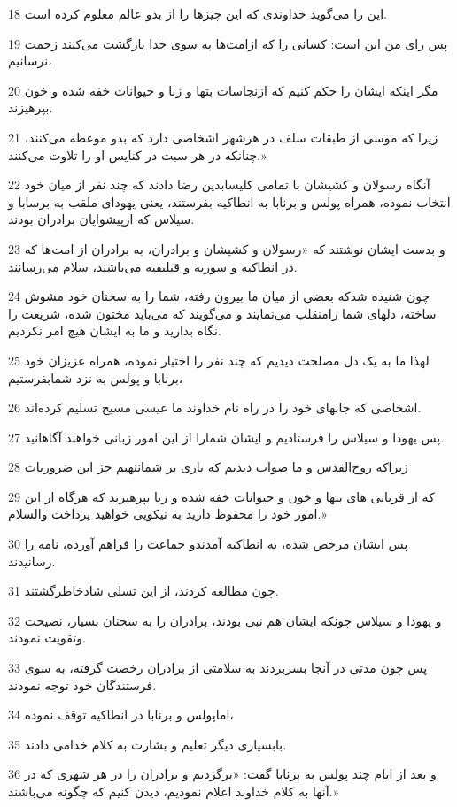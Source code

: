 \par 18 این را می‌گوید خداوندی که این چیزها را از بدو عالم معلوم کرده است.
\par 19 پس رای من این است: کسانی را که ازامت‌ها به سوی خدا بازگشت می‌کنند زحمت نرسانیم،
\par 20 مگر اینکه ایشان را حکم کنیم که ازنجاسات بتها و زنا و حیوانات خفه شده و خون بپرهیزند.
\par 21 زیرا که موسی از طبقات سلف در هرشهر اشخاصی دارد که بدو موعظه می‌کنند، چنانکه در هر سبت در کنایس او را تلاوت می‌کنند.»
\par 22 آنگاه رسولان و کشیشان با تمامی کلیسابدین رضا دادند که چند نفر از میان خود انتخاب نموده، همراه پولس و برنابا به انطاکیه بفرستند، یعنی یهودای ملقب به برسابا و سیلاس که ازپیشوایان برادران بودند.
\par 23 و بدست ایشان نوشتند که «رسولان و کشیشان و برادران، به برادران از امت‌ها که در انطاکیه و سوریه و قیلیقیه می‌باشند، سلام می‌رسانند.
\par 24 چون شنیده شدکه بعضی از میان ما بیرون رفته، شما را به سخنان خود مشوش ساخته، دلهای شما رامنقلب می‌نمایند و می‌گویند که می‌باید مختون شده، شریعت را نگاه بدارید و ما به ایشان هیچ امر نکردیم.
\par 25 لهذا ما به یک دل مصلحت دیدیم که چند نفر را اختیار نموده، همراه عزیزان خود برنابا و پولس به نزد شمابفرستیم،
\par 26 اشخاصی که جانهای خود را در راه نام خداوند ما عیسی مسیح تسلیم کرده‌اند.
\par 27 پس یهودا و سیلاس را فرستادیم و ایشان شمارا از این امور زبانی خواهند آگاهانید.
\par 28 زیراکه روح‌القدس و ما صواب دیدیم که باری بر شماننهیم جز این ضروریات
\par 29 که از قربانی های بتها و خون و حیوانات خفه شده و زنا بپرهیزید که هرگاه از این امور خود را محفوظ دارید به نیکویی خواهید پرداخت والسلام.»
\par 30 پس ایشان مرخص شده، به انطاکیه آمدندو جماعت را فراهم آورده، نامه را رسانیدند.
\par 31 چون مطالعه کردند، از این تسلی شادخاطرگشتند.
\par 32 و یهودا و سیلاس چونکه ایشان هم نبی بودند، برادران را به سخنان بسیار، نصیحت وتقویت نمودند.
\par 33 پس چون مدتی در آنجا بسربردند به سلامتی از برادران رخصت گرفته، به سوی فرستندگان خود توجه نمودند.
\par 34 اماپولس و برنابا در انطاکیه توقف نموده،
\par 35 بابسیاری دیگر تعلیم و بشارت به کلام خدامی دادند.
\par 36 و بعد از ایام چند پولس به برنابا گفت: «برگردیم و برادران را در هر شهری که در آنها به کلام خداوند اعلام نمودیم، دیدن کنیم که چگونه می‌باشند.»
